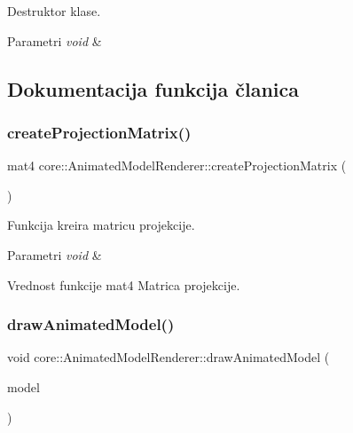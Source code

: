 Destruktor klase. 


\begin{DoxyParams}{Parametri}
{\em void} & \\
\hline
\end{DoxyParams}


\subsection{Dokumentacija funkcija članica}
\mbox{\label{classcore_1_1AnimatedModelRenderer_a937c6ee9822091b28bbd33c7830070d1}} 
\subsubsection{\texorpdfstring{create\+Projection\+Matrix()}{createProjectionMatrix()}}
{\footnotesize\ttfamily mat4 core\+::\+Animated\+Model\+Renderer\+::create\+Projection\+Matrix (\begin{DoxyParamCaption}{ }\end{DoxyParamCaption})\hspace{0.3cm}{\ttfamily [private]}}



Funkcija kreira matricu projekcije. 


\begin{DoxyParams}{Parametri}
{\em void} & \\
\hline
\end{DoxyParams}
\begin{DoxyReturn}{Vrednost funkcije}
mat4 Matrica projekcije. 
\end{DoxyReturn}
\mbox{\label{classcore_1_1AnimatedModelRenderer_a8b495a2557e6ca557dfd5129a6400958}} 
\subsubsection{\texorpdfstring{draw\+Animated\+Model()}{drawAnimatedModel()}}
{\footnotesize\ttfamily void core\+::\+Animated\+Model\+Renderer\+::draw\+Animated\+Model (\begin{DoxyParamCaption}\item[{\hyperlink{classmodel_1_1AnimatedModel}{Animated\+Model} $\ast$}]{model }\end{DoxyParamCaption})}



